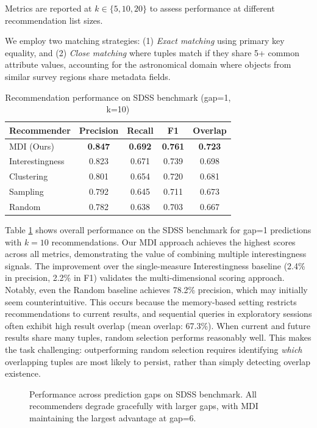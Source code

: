 \documentclass[sigconf, nonacm]{acmart}
\begin{document}
Metrics are reported at $k \in \{5, 10, 20\}$ to assess performance at different recommendation list sizes.

We employ two matching strategies: (1) \textit{Exact matching} using primary key equality, and (2) \textit{Close matching} where tuples match if they share 5+ common attribute values, accounting for the astronomical domain where objects from similar survey regions share metadata fields.



\begin{table}[t]
\centering
\caption{Recommendation performance on SDSS benchmark (gap=1, k=10)}
\label{tab:sdss_results}
\begin{tabular}{lcccc}
\toprule
\textbf{Recommender} & \textbf{Precision} & \textbf{Recall} & \textbf{F1} & \textbf{Overlap} \\
\midrule
MDI (Ours) & \textbf{0.847} & \textbf{0.692} & \textbf{0.761} & \textbf{0.723} \\
Interestingness & 0.823 & 0.671 & 0.739 & 0.698 \\
Clustering & 0.801 & 0.654 & 0.720 & 0.681 \\
Sampling & 0.792 & 0.645 & 0.711 & 0.673 \\
Random & 0.782 & 0.638 & 0.703 & 0.667 \\
\bottomrule
\end{tabular}
\end{table}

Table \ref{tab:sdss_results} shows overall performance on the SDSS benchmark for gap=1 predictions with $k=10$ recommendations. Our MDI approach achieves the highest scores across all metrics, demonstrating the value of combining multiple interestingness signals. The improvement over the single-measure Interestingness baseline (2.4\% in precision, 2.2\% in F1) validates the multi-dimensional scoring approach. Notably, even the Random baseline achieves 78.2\% precision, which may initially seem counterintuitive. This occurs because the memory-based setting restricts recommendations to current results, and sequential queries in exploratory sessions often exhibit high result overlap (mean overlap: 67.3\%). When current and future results share many tuples, random selection performs reasonably well. This makes the task challenging: outperforming random selection requires identifying \textit{which} overlapping tuples are most likely to persist, rather than simply detecting overlap existence.

\begin{figure}[t]
\centering
\caption{Performance across prediction gaps on SDSS benchmark. All recommenders degrade gracefully with larger gaps, with MDI maintaining the largest advantage at gap=6.}
\label{fig:gap_analysis}
\end{figure}
\end{document}
